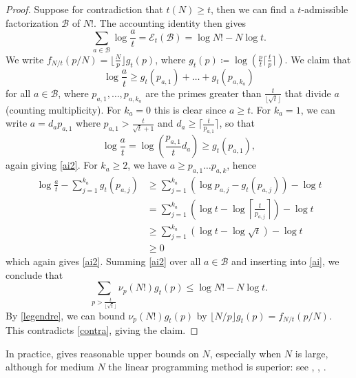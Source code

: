 \documentclass[12pt,a4paper,reqno]{amsart}
\numberwithin{equation}{section}
\theoremstyle{plain}
\theoremstyle{definition}
\newcommand\tuple{{\mathcal B}}
\newcommand\excess{{\mathcal{E}}}
\begin{document}
  \begin{proof} Suppose for contradiction that $t(N) \geq t$, then we can find a $t$-admissible factorization $\tuple$ of $N!$.  The accounting identity then gives
  \begin{equation}\label{ai}
  \sum_{a \in \tuple} \log \frac{a}{t} = \excess_t(\tuple) = \log N! - N \log t.
  \end{equation}
  We write $f_{N/t}(p/N) = \lfloor \frac{N}{p} \rfloor g_t(p)$, where $g_t(p) \coloneqq \log (\frac{p}{t} \lceil \frac{t}{p} \rceil)$.  We claim that 
    \begin{equation}\label{ai2}
      \log \frac{a}{t} \geq g_t(p_{a,1}) + \dots + g_t(p_{a,k_a})
    \end{equation}
for all $a \in \tuple$, where $p_{a,1},\dots,p_{a,k_a}$ are the primes greater than $\frac{t}{\lfloor \sqrt{t}\rfloor}$ that divide $a$ (counting multiplicity).  For $k_a=0$ this is clear since $a \geq t$.  For $k_a=1$, we can write $a = d_a p_{a,1}$ where $p_{a,1} > \frac{t}{\sqrt{t}+1}$ and $d_a \geq \lceil \frac{t}{p_{a,1}} \rceil$, so that
    $$ \log \frac{a}{t} = \log \left(\frac{p_{a,1}}{t}d_a \right) \geq g_t(p_{a,1}),$$
    again giving \eqref{ai2}.  For $k_a \geq 2$, we have $a \geq p_{a,1} \dots p_{a,k}$, hence
    \begin{align*}
      \log \frac{a}{t} - \sum_{j=1}^{k_a} g_t(p_{a,j}) &\geq \sum_{j=1}^{k_a} (\log p_{a,j} - g_t(p_{a,j})) - \log t \\
      &= \sum_{j=1}^{k_a} \left(\log t - \log \left \lceil \frac{t}{p_{a,j}} \right\rceil \right) - \log t \\
      &\geq \sum_{j=1}^{k_a} \left(\log t - \log \sqrt{t} \right) - \log t \\
      &\geq 0
    \end{align*}
    which again gives \eqref{ai2}.  Summing \eqref{ai2} over all $a \in \tuple$ and inserting into \eqref{ai}, we conclude that
    $$ \sum_{p > \frac{t}{\lfloor\sqrt{t}\rfloor}} \nu_p(N!) g_t(p) \leq \log N! - N \log t.$$    
    By \eqref{legendre}, we can bound $\nu_p(N!) g_t(p)$ by $\lfloor N/p \rfloor g_t(p) = f_{N/t}(p/N)$.  This contradicts \eqref{contra}, giving the claim. 
  \end{proof}

In practice,  gives reasonable upper bounds on $N$, especially when $N$ is large, although for medium $N$ the linear programming method is superior: see , , .
    
\end{document}
